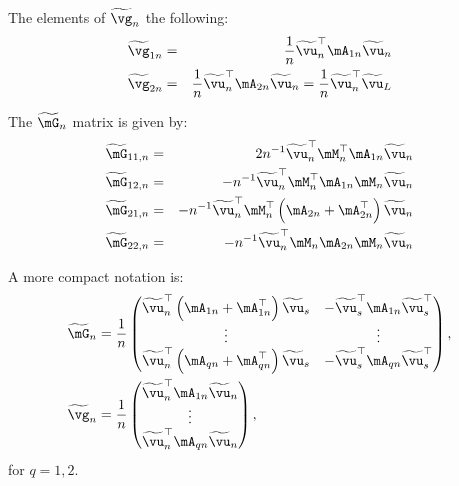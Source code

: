 The elements of $\widetilde{\vg}_n$ the following:
\begin{eqnarray*}
	\widetilde{\vg}_{1n}  &=& \frac{1}{n}\widetilde{\vu}^\top_n\mA_{1n}\widetilde{\vu}_n \\
\widetilde{\vg}_{2n}  &=&  \frac{1}{n}\widetilde{\vu}^\top_n\mA_{2n}\widetilde{\vu}_n   =  \frac{1}{n} \widetilde{\vu}^\top_n\widetilde{\vu}_L
\end{eqnarray*}

The $\widetilde{\mG}_n$ matrix is given by:
\begin{eqnarray*}
\widetilde{\mG}_{11,n} &=& 2n^{-1}\widetilde{\vu}^\top_n\mM^\top_n\mA_{1n}\widetilde{\vu}_n \\
\widetilde{\mG}_{12,n} &=& -n^{-1}\widetilde{\vu}^\top_n\mM^\top_n\mA_{1n}\mM_n\widetilde{\vu}_n \\
\widetilde{\mG}_{21,n} &=& -n^{-1}\widetilde{\vu}^\top_n\mM^\top_n\left(\mA_{2n} + \mA_{2n}^\top\right)\widetilde{\vu}_n \\
\widetilde{\mG}_{22,n}&=& -n^{-1}\widetilde{\vu}^\top_n\mM_n\mA_{2n}\mM_n\widetilde{\vu}_n
\end{eqnarray*}

A more compact notation is:
\begin{equation*}
\begin{aligned}
\widetilde{\mG}_n & = \frac{1}{n}
                    \begin{pmatrix}
                      \widetilde{\vu}^\top_n\left(\mA_{1n} + \mA^\top_{1n}\right)\widetilde{\vu}_s & - \widetilde{\vu}^\top_s\mA_{1n}\widetilde{\vu}^\top_s \\
                      \vdots & \vdots \\
                      \widetilde{\vu}^\top_n\left(\mA_{qn} + \mA^\top_{qn}\right)\widetilde{\vu}_s & - \widetilde{\vu}^\top_s\mA_{qn}\widetilde{\vu}^\top_s
                    \end{pmatrix}, \\
\widetilde{\vg}_n & = \frac{1}{n}\begin{pmatrix}
                                \widetilde{\vu}^\top_n\mA_{1n}\widetilde{\vu}_n \\
                                \vdots \\
                                \widetilde{\vu}^\top_n\mA_{qn}\widetilde{\vu}_n
                                \end{pmatrix},
\end{aligned}
\end{equation*}
%
for $q = 1, 2$.

